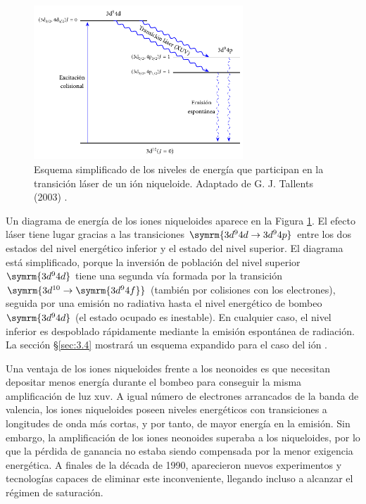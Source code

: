 \begin{figure}[htbp]
  \centering
  \includegraphics[width=0.7\textwidth]{Figuras/ch1_niquel_like.pdf}
  \caption{Esquema simplificado de los niveles de energía que participan en la transición láser de un ión niqueloide. Adaptado de G. J. Tallents (2003) \autocite{Tallents2003}.}
  \label{fig:1.23}
\end{figure}

Un diagrama de energía de los iones niqueloides aparece en la Figura \ref{fig:1.23}. El efecto láser tiene lugar gracias a las transiciones $\symrm{3d^{9}4d \rightarrow 3d^{9}4p}$ entre los dos estados del nivel energético inferior y el estado del nivel superior. El diagrama está simplificado, porque la inversión de población del nivel superior $\symrm{3d^{9}4d}$ tiene una segunda vía formada por la transición $\symrm{3d^{10} \rightarrow \symrm{3d^{9}4f}}$ (también por colisiones con los electrones), seguida por una emisión no radiativa hasta el nivel energético de bombeo $\symrm{3d^{9}4d}$ (el estado ocupado es inestable). En cualquier caso, el nivel inferior es despoblado rápidamente mediante la emisión espontánea de radiación. La sección \S\ref{sec:3.4} mostrará un esquema expandido para el caso del ión .

Una ventaja de los iones niqueloides frente a los neonoides es que necesitan depositar menos energía durante el bombeo para conseguir la misma amplificación de luz \acrshort{xuv}. A igual número de electrones arrancados de la banda de valencia, los iones niqueloides poseen niveles energéticos con transiciones a longitudes de onda más cortas, y por tanto, de mayor energía en la emisión. Sin embargo, la amplificación de los iones neonoides superaba a los niqueloides, por lo que la pérdida de ganancia no estaba siendo compensada por la menor exigencia energética. A finales de la década de 1990, aparecieron nuevos experimentos y tecnologías capaces de eliminar este inconveniente, llegando incluso a alcanzar el régimen de saturación. 

